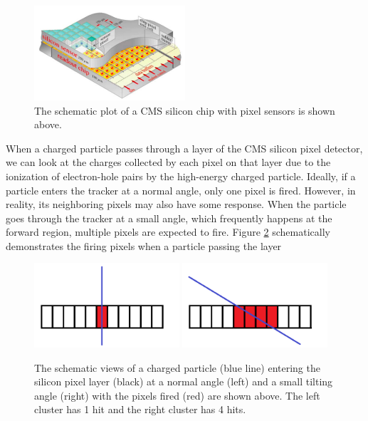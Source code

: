 \begin{figure}[hbtp]
\begin{center}
\includegraphics[width=0.50\textwidth]{Figures/Chapter4/CMSPixChip.png}
\caption{The schematic plot of a CMS silicon chip with pixel sensors is shown above.}
\label{CMSPixChip}
\end{center}
\end{figure} 

When a charged particle passes through a layer of the CMS silicon pixel detector, we can look at the charges collected by each pixel on that layer due to the ionization of electron-hole pairs by the high-energy charged particle. Ideally, if a particle enters the tracker at a normal angle, only one pixel is fired. However, in reality, its neighboring pixels may also have some response. When the particle goes through the tracker at a small angle, which frequently happens at the forward region, multiple pixels are expected to fire. Figure \ref{HitDemo} schematically demonstrates the firing pixels when a particle passing the layer

\begin{figure}[hbtp]
\begin{center}
\includegraphics[width=0.48\textwidth]{Figures/Chapter4/Hit1.png}
\includegraphics[width=0.48\textwidth]{Figures/Chapter4/Hit2.png}
\caption{The schematic views of a charged particle (blue line) entering the silicon pixel layer (black) at a normal angle (left) and a small tilting angle (right) with the pixels fired (red) are shown above. The left cluster has 1 hit and the right cluster has 4 hits.}
\label{HitDemo}
\end{center}
\end{figure} 

